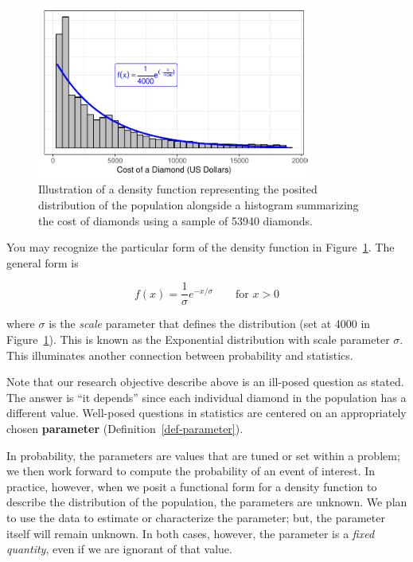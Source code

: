 \documentclass[
  letterpaper,
  DIV=11,
  numbers=noendperiod]{scrreprt}
\theoremstyle{definition}
\theoremstyle{definition}
\theoremstyle{plain}
\theoremstyle{remark}
\begin{document}
\begin{figure}

{\centering \includegraphics[width=0.8\textwidth,height=\textheight]{./images/fig-randomvariables-density-1.pdf}

}

\caption{\label{fig-randomvariables-density}Illustration of a density
function representing the posited distribution of the population
alongside a histogram summarizing the cost of diamonds using a sample of
53940 diamonds.}

\end{figure}

You may recognize the particular form of the density function in
Figure~\ref{fig-randomvariables-density}. The general form is

\[f(x) = \frac{1}{\sigma} e^{-x / \sigma} \qquad \text{for } x > 0\]

where \(\sigma\) is the \emph{scale} parameter that defines the
distribution (set at 4000 in Figure~\ref{fig-randomvariables-density}).
This is known as the Exponential distribution with scale parameter
\(\sigma\). This illuminates another connection between probability and
statistics.

Note that our research objective describe above is an ill-posed question
as stated. The answer is ``it depends'' since each individual diamond in
the population has a different value. Well-posed questions in statistics
are centered on an appropriately chosen \textbf{parameter}
(Definition~\ref{def-parameter}).

In probability, the parameters are values that are tuned or set within a
problem; we then work forward to compute the probability of an event of
interest. In practice, however, when we posit a functional form for a
density function to describe the distribution of the population, the
parameters are unknown. We plan to use the data to estimate or
characterize the parameter; but, the parameter itself will remain
unknown. In both cases, however, the parameter is a \emph{fixed
quantity}, even if we are ignorant of that value.
\end{document}
